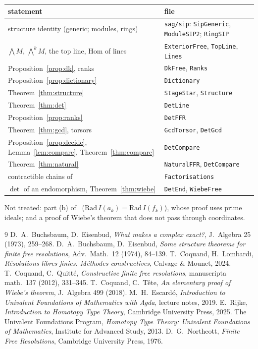 \documentclass[11pt]{amsart}
\theoremstyle{definition}
\theoremstyle{remark}
\newcommand{\code}[1]{\texttt{#1}}
\newcommand{\Hom}{\mathrm{Hom}}
\newcommand{\Ex}{{\textstyle\bigwedge}}
\begin{document}
\medskip
{\small\begin{tabular}{ll}
statement & file\\\hline
structure identity (generic; modules, rings) & \code{sag/sip}: \code{SipGeneric}, \code{ModuleSIP2}; \code{RingSIP}\\
$\Ex M$, $\Ex^kM$, the top line, $\Hom$ of lines & \code{ExteriorFree}, \code{TopLine}, \code{Lines}\\
Proposition~\ref{prop:dk}, ranks & \code{DkFree}, \code{Ranks}\\
Proposition~\ref{prop:dictionary} & \code{Dictionary}\\
Theorem~\ref{thm:structure} & \code{StageStar}, \code{Structure}\\
Theorem~\ref{thm:det} & \code{DetLine}\\
Proposition~\ref{prop:ranks} & \code{DetFFR}\\
Theorem~\ref{thm:gcd}, torsors & \code{GcdTorsor}, \code{DetGcd}\\
Proposition~\ref{prop:decide}, Lemma~\ref{lem:compare}, Theorem~\ref{thm:compare} & \code{DetCompare}\\
Theorem~\ref{thm:natural} & \code{NaturalFFR}, \code{DetCompare}\\
contractible chains of~\cite[Cor.~8.5]{CQ} & \code{Factorisations}\\
$\det$ of an endomorphism, Theorem~\ref{thm:wiebe} & \code{DetEnd}, \code{WiebeFree}
\end{tabular}}

\medskip
Not treated: part (b) of~\cite[Theorem~3.1]{BE74}
($\mathrm{Rad}\,I(a_k)=\mathrm{Rad}\,I(f_k)$), whose proof uses prime
ideals; and a proof of Wiebe's theorem that does not pass through
coordinates.

\begin{thebibliography}{9}
 D.~A.~Buchsbaum, D.~Eisenbud, \emph{What makes a complex
  exact?}, J.~Algebra 25 (1973), 259--268.
 D.~A.~Buchsbaum, D.~Eisenbud, \emph{Some structure
  theorems for finite free resolutions}, Adv.~Math.~12 (1974), 84--139.
 T.~Coquand, H.~Lombardi, \emph{R\'esolutions libres finies.
  M\'ethodes constructives}, Calvage \& Mounet, 2024.
 T.~Coquand, C.~Quitt\'e, \emph{Constructive finite free
  resolutions}, manuscripta math.~137 (2012), 331--345.
 T.~Coquand, C.~T\^ete, \emph{An elementary proof of Wiebe's
  theorem}, J.~Algebra 499 (2018).
 M.~H.~Escard\'o, \emph{Introduction to Univalent Foundations
  of Mathematics with Agda}, lecture notes, 2019.
 E.~Rijke, \emph{Introduction to Homotopy Type Theory},
  Cambridge University Press, 2025.
 The Univalent Foundations Program, \emph{Homotopy Type
  Theory: Univalent Foundations of Mathematics}, Institute for Advanced
  Study, 2013.
 D.~G.~Northcott, \emph{Finite Free Resolutions}, Cambridge
  University Press, 1976.
\end{thebibliography}
\end{document}
